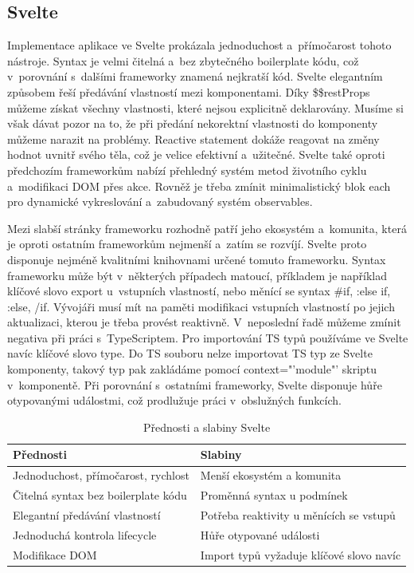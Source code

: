 \subsection*{Svelte}

Implementace aplikace ve Svelte prokázala jednoduchost a~přímočarost tohoto nástroje. 
Syntax je velmi čitelná a~bez zbytečného boilerplate kódu, což v~porovnání s~dalšími frameworky znamená nejkratší kód. 
Svelte elegantním způsobem řeší předávání vlastností mezi komponentami. 
Díky \$\$restProps můžeme získat všechny vlastnosti, které nejsou explicitně deklarovány. 
Musíme si však dávat pozor na to, že při předání nekorektní vlastnosti do komponenty můžeme narazit na problémy. 
Reactive statement dokáže reagovat na změny hodnot uvnitř svého těla, což je velice efektivní a~užitečné. 
Svelte také oproti předchozím frameworkům nabízí přehledný systém metod životního cyklu a~modifikaci DOM přes akce. 
Rovněž je třeba zmínit minimalistický blok each pro dynamické vykreslování a~zabudovaný systém observables. 

Mezi slabší stránky frameworku rozhodně patří jeho ekosystém a~komunita, která je oproti ostatním frameworkům nejmenší a~zatím se rozvíjí. 
Svelte proto disponuje nejméně kvalitními knihovnami určené tomuto frameworku. 
Syntax frameworku může být v~některých případech matoucí, příkladem je například klíčové slovo export u~vstupních vlastností, nebo měnící se syntax \#if, :else if, :else, /if. 
Vývojáři musí mít na paměti modifikaci vstupních vlastností po jejich aktualizaci, kterou je třeba provést reaktivně. 
V~neposlední řadě můžeme zmínit negativa při práci s~TypeScriptem. Pro importování TS typů používáme ve Svelte navíc klíčové slovo type. 
Do TS souboru nelze importovat TS typ ze Svelte komponenty, takový typ pak zakládáme pomocí context="'module"' skriptu v~komponentě.
Při porovnání s~ostatními frameworky, Svelte disponuje hůře otypovanými událostmi, což prodlužuje práci v~obslužných funkcích.

\begin{table}[htb]
	\centering
	\caption{Přednosti a slabiny Svelte}
	\medskip
	\radkovani[1.2]
		\begin{tabular}{|l|l|}
		\hline
		\textbf{Přednosti}									& \textbf{Slabiny}                    			\\ \hline
		Jednoduchost, přímočarost, rychlost & Menší ekosystém a komunita              	\\ \hline
		Čitelná syntax bez boilerplate kódu	& Proměnná syntax u podmínek  							\\ \hline
		Elegantní předávání vlastností			& Potřeba reaktivity u měnících se vstupů		\\ \hline
		Jednoduchá kontrola lifecycle				& Hůře otypované události										\\ \hline
		Modifikace DOM											& Import typů vyžaduje klíčové slovo navíc	\\ \hline
		\end{tabular}
	\label{tab:sveltetabulka}
\end{table}

